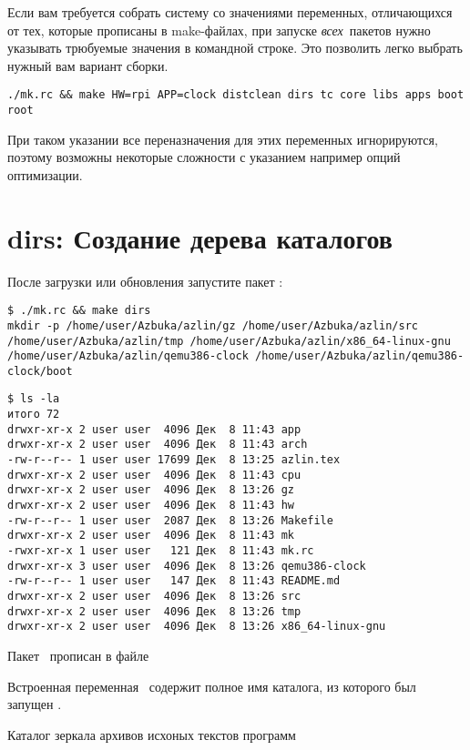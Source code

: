 Если вам требуется собрать систему со значениями переменных, отличающихся от
тех, которые прописаны в make-файлах, при запуске \emph{всех}\ пакетов нужно
указывать трюбуемые значения в командной строке. Это позволить легко выбрать
нужный вам вариант сборки.

\begin{verbatim}
./mk.rc && make HW=rpi APP=clock distclean dirs tc core libs apps boot root 
\end{verbatim}

При таком указании все переназначения для этих переменных игнорируются, поэтому
возможны некоторые сложности с указанием например опций оптимизации.

\section{dirs: Создание дерева каталогов}

После загрузки или обновления запустите пакет :

\begin{verbatim}
$ ./mk.rc && make dirs
mkdir -p /home/user/Azbuka/azlin/gz /home/user/Azbuka/azlin/src 
/home/user/Azbuka/azlin/tmp /home/user/Azbuka/azlin/x86_64-linux-gnu 
/home/user/Azbuka/azlin/qemu386-clock /home/user/Azbuka/azlin/qemu386-clock/boot
\end{verbatim}
\begin{verbatim}
$ ls -la
итого 72
drwxr-xr-x 2 user user  4096 Дек  8 11:43 app
drwxr-xr-x 2 user user  4096 Дек  8 11:43 arch
-rw-r--r-- 1 user user 17699 Дек  8 13:25 azlin.tex
drwxr-xr-x 2 user user  4096 Дек  8 11:43 cpu
drwxr-xr-x 2 user user  4096 Дек  8 13:26 gz
drwxr-xr-x 2 user user  4096 Дек  8 11:43 hw
-rw-r--r-- 1 user user  2087 Дек  8 13:26 Makefile
drwxr-xr-x 2 user user  4096 Дек  8 11:43 mk
-rwxr-xr-x 1 user user   121 Дек  8 11:43 mk.rc
drwxr-xr-x 3 user user  4096 Дек  8 13:26 qemu386-clock
-rw-r--r-- 1 user user   147 Дек  8 11:43 README.md
drwxr-xr-x 2 user user  4096 Дек  8 13:26 src
drwxr-xr-x 2 user user  4096 Дек  8 13:26 tmp
drwxr-xr-x 2 user user  4096 Дек  8 13:26 x86_64-linux-gnu
\end{verbatim}

Пакет \ прописан в файле


Встроенная переменная \ содержит полное имя каталога, из которого был
запущен .

\bigskip
Каталог зеркала архивов исхоных текстов программ

